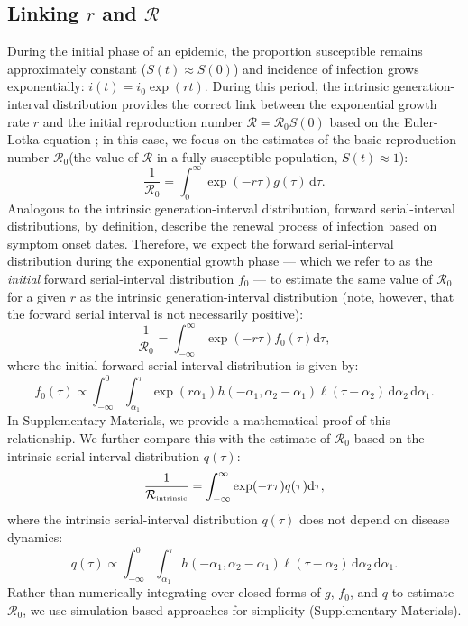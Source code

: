\documentclass[12pt]{article}
\newcommand{\Rx}[1]{\ensuremath{{\mathcal R}_{#1}}\xspace}
\newcommand{\Ro}{\Rx{0}}
\newcommand{\RR}{\ensuremath{{\mathcal R}}\xspace}
\newcommand{\Rintrinsic}{\ensuremath{{\mathcal R}_{\textrm{\tiny intrinsic}}}\xspace}
\newcommand{\dd}[1]{\ensuremath{\, \mathrm{d}#1}}
\newcommand{\dtau}{\dd{\tau}}
\newcommand{\pinf}{\ensuremath{\alpha_1}} %
\newcommand{\sinf}{\ensuremath{\alpha_2}} %
\newcommand{\idist}{\ell} %
\begin{document}
\subsection{Linking $r$ and \RR}

During the initial phase of an epidemic, the proportion susceptible remains approximately constant ($S(t) \approx S(0)$) and incidence of infection grows exponentially: $i(t)=i_0\exp(rt)$.
During this period, the intrinsic generation-interval distribution provides the correct link between the exponential growth rate $r$ and the initial reproduction number $\RR=\Ro S(0)$ based on the Euler-Lotka equation \citep{wallinga2007generation};
in this case, we focus on the estimates of the basic reproduction number \Ro (the value of \RR in a fully susceptible population, $S(t) \approx 1$):
\begin{equation}
\frac{1}{\Ro} = \int_0^\infty \exp(-r\tau) g(\tau) \dtau.
\label{eq:Rgen}
\end{equation}
Analogous to the intrinsic generation-interval distribution, 
forward serial-interval distributions, by definition, describe the renewal process of infection based on symptom onset dates.
Therefore, we expect the forward serial-interval distribution during the exponential growth phase --- which we refer to as the \emph{initial} forward serial-interval distribution $f_0$ --- to estimate the same value of \Ro for a given $r$ as the intrinsic generation-interval distribution (note, however, that the forward serial interval is not necessarily positive):
\begin{equation}
\frac{1}{\Ro} = \int_{-\infty}^\infty \exp(-r\tau) f_{0}(\tau) \mathrm{d} \tau,
\label{eq:Rforward}
\end{equation}
where the initial forward serial-interval distribution is given by:
\begin{equation}
f_{0}(\tau) \propto \int_{-\infty}^{0} \int_{\pinf}^{\tau} \exp(r \pinf) h(-\pinf, \sinf - \pinf) \idist(\tau - \sinf) \, \mathrm{d}\sinf\,\mathrm{d}\pinf.
\label{eq:initialSI}
\end{equation}
In Supplementary Materials, we provide a mathematical proof of this relationship.
We further compare this with the estimate of \Ro based on the intrinsic serial-interval distribution $q(\tau)$:
\begin{equation}
\frac{1}{\Rintrinsic} = \int_{-\infty}^\infty \exp(-r\tau) q(\tau) \mathrm{d} \tau,
\label{eq:Rintrinsic}
\end{equation}
where the intrinsic serial-interval distribution $q(\tau)$ does not depend on disease dynamics:
\begin{equation}
q(\tau) \propto \int_{-\infty}^{0} \int_{\pinf}^{\tau} h(-\pinf, \sinf - \pinf) \idist(\tau - \sinf) \, \mathrm{d}\sinf\,\mathrm{d}\pinf.
\label{eq:intrinsicSI}
\end{equation}
Rather than numerically integrating over closed forms of $g$, $f_0$, and $q$ to estimate $\Ro$, we use simulation-based approaches for simplicity (Supplementary Materials).
\end{document}
